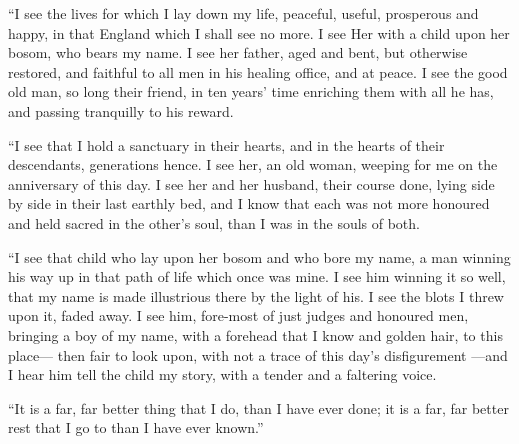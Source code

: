 ``I see the lives for which I lay down my life, peaceful, useful,
prosperous and happy, in that England which I shall see no more.
I see Her with a child upon her bosom, who bears my name.  I see her
father, aged and bent, but otherwise restored, and faithful to all
men in his healing office, and at peace.  I see the good old man, so
long their friend, in ten years' time enriching them with all he has,
and passing tranquilly to his reward.

``I see that I hold a sanctuary in their hearts, and in the hearts of
their descendants, generations hence.  I see her, an old woman,
weeping for me on the anniversary of this day.  I see her and her
husband, their course done, lying side by side in their last earthly
bed, and I know that each was not more honoured and held sacred in
the other's soul, than I was in the souls of both.

``I see that child who lay upon her bosom and who bore my name, a man
winning his way up in that path of life which once was mine.  I see
him winning it so well, that my name is made illustrious there by the
light of his.  I see the blots I threw upon it, faded away.  I see
him, fore-most of just judges and honoured men, bringing a boy of my
name, with a forehead that I know and golden hair, to this place---%
then fair to look upon, with not a trace of this day's disfigurement%
---and I hear him tell the child my story, with a tender and a faltering voice.

``It is a far, far better thing that I do, than I have ever done;
it is a far, far better rest that I go to than I have ever known.''





